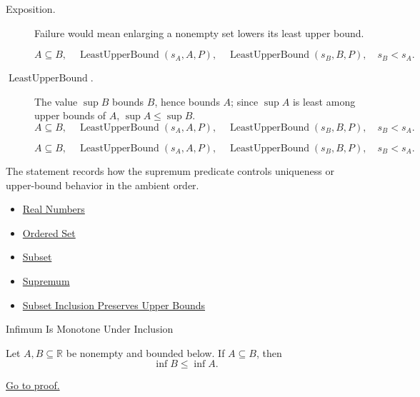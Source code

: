 \begin{remark*}
\begin{description}
  \item[Exposition.]
  Failure would mean enlarging a nonempty set lowers its least upper bound.

  
\[
A\subseteq B,\quad \operatorname{LeastUpperBound}(s_A,A,P),\quad
  \operatorname{LeastUpperBound}(s_B,B,P),\quad s_B<s_A.
\]
  \item[\(\operatorname{LeastUpperBound}.\)]
  The value $\sup B$ bounds $B$, hence bounds $A$; since $\sup A$ is least
  among upper bounds of $A$, $\sup A\leq\sup B$.
  \[
    A\subseteq B,\quad \operatorname{LeastUpperBound}(s_A,A,P),\quad
    \operatorname{LeastUpperBound}(s_B,B,P),\quad s_B<s_A.
  \]

\[
    A\subseteq B,\quad \operatorname{LeastUpperBound}(s_A,A,P),\quad
    \operatorname{LeastUpperBound}(s_B,B,P),\quad s_B<s_A.
  \]
\end{description}
\end{remark*}

\begin{remark*}[Interpretation]
The statement records how the supremum predicate controls uniqueness or upper-bound behavior in the ambient order.
\end{remark*}

\begin{dependencies}
\begin{itemize}
  \item \hyperref[def:reals]{Real Numbers}
  \item \hyperref[def:ordered-set]{Ordered Set}
  \item \hyperref[def:subset]{Subset}
  \item \hyperref[def:supremum]{Supremum}
  \item \hyperref[lem:subset-inclusion-preserves-upper-bounds]{Subset Inclusion Preserves Upper Bounds}
\end{itemize}
\end{dependencies}

\begin{theorembox}{Infimum Is Monotone Under Inclusion}
\begin{theorem}
\label{thm:infimum-is-monotone-under-inclusion}
Let $A,B\subseteq\mathbb{R}$ be nonempty and bounded below. If
$A\subseteq B$, then
\[
  \inf B\leq\inf A.
\]

\hyperref[prf:infimum-is-monotone-under-inclusion]{Go to proof.}
\end{theorem}
\end{theorembox}

